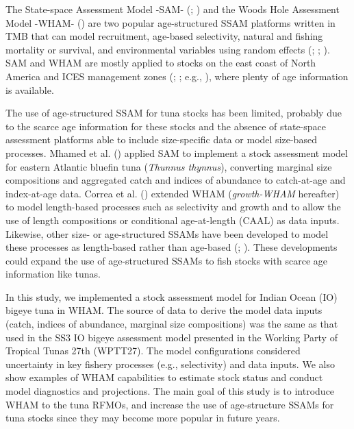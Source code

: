\documentclass[
]{scrartcl}
\begin{document}
The State-space Assessment Model -SAM-
(;
) and the Woods Hole Assessment Model -WHAM-
()
are two popular age-structured SSAM platforms written in TMB that can
model recruitment, age-based selectivity, natural and fishing mortality
or survival, and environmental variables using random effects
(; ; ). SAM and WHAM are mostly applied to stocks on the east
coast of North America and ICES management zones
(;
; e.g.,
), where plenty of
age information is available.

The use of age-structured SSAM for tuna stocks has been limited,
probably due to the scarce age information for these stocks and the
absence of state-space assessment platforms able to include
size-specific data or model size-based processes. Mhamed et al.
() applied SAM to
implement a stock assessment model for eastern Atlantic bluefin tuna
(\emph{Thunnus thynnus}), converting marginal size compositions and
aggregated catch and indices of abundance to catch-at-age and
index-at-age data. Correa et al.
() extended
WHAM (\emph{growth-WHAM} hereafter) to model length-based processes such
as selectivity and growth and to allow the use of length compositions or
conditional age-at-length (CAAL) as data inputs. Likewise, other size-
or age-structured SSAMs have been developed to model these processes as
length-based rather than age-based
(; ). These developments could expand the use of age-structured SSAMs
to fish stocks with scarce age information like tunas.

In this study, we implemented a stock assessment model for Indian Ocean
(IO) bigeye tuna in WHAM. The source of data to derive the model data
inputs (catch, indices of abundance, marginal size compositions) was the
same as that used in the SS3 IO bigeye assessment model presented in the
Working Party of Tropical Tunas 27th (WPTT27). The model configurations
considered uncertainty in key fishery processes (e.g., selectivity) and
data inputs. We also show examples of WHAM capabilities to estimate
stock status and conduct model diagnostics and projections. The main
goal of this study is to introduce WHAM to the tuna RFMOs, and increase
the use of age-structure SSAMs for tuna stocks since they may become
more popular in future years.
\end{document}
